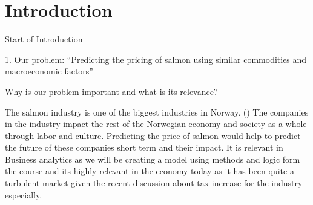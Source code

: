 \section{Introduction}

Start of Introduction

1. Our problem: “Predicting the pricing of salmon using similar commodities and macroeconomic factors” 
 
Why is our problem important and what is its relevance? 
  
The salmon industry is one of the biggest industries in Norway. (\cite{Johansen_et_al_2019}) The companies in the 	industry impact the rest of the Norwegian economy and society as a whole through labor and culture. Predicting the price of salmon would help to predict the future of these 	companies short term and their impact. 
It is relevant in Business analytics as we will be creating a model using methods and logic form the course and its highly relevant in the economy today as it has been quite a turbulent market given the recent discussion about tax increase for the industry especially.